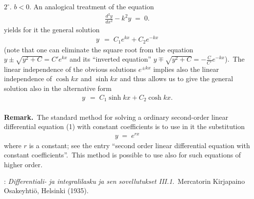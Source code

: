 \documentclass[12pt]{article}
\begin{document}
\textbf{$2^\circ$}.\; $b < 0$.\;  An analogical treatment of 
the equation
\begin{align}
      \frac{d^2y}{dx^2}-k^2y \;=\; 0.
\end{align}
yields for it the general solution
\begin{align}
y \,\;=\; C_1e^{kx}+C_2e^{-kx}
\end{align}
(note that one can eliminate the square root from the equation
$y\pm\sqrt{y^2+C} = C'e^{kx}$ and its ``inverted equation'' 
$y\mp\sqrt{y^2+C} = -\frac{C}{C'}e^{-kx}$).\, The linear independence 
of the obvious solutions $e^{\pm kx}$ implies also the linear 
independence of $\cosh kx$ and $\sinh kx$ and thus allows us to
give the general solution also in the alternative form
\begin{align}
y \,\;=\; C_1\sinh kx+C_2\cosh kx.
\end{align}\\

\textbf{Remark.}\, The standard method for solving a 
ordinary second-order linear differential equation (1) with 
constant coefficients is to use in it the 
substitution
\begin{align}
y \;=\; e^{rx}
\end{align}
where $r$ is a constant; see the entry ``second order linear 
differential equation with constant coefficients''.\, This method 
is possible to use also for such equations of higher order.\\



\begin{thebibliography}{8}
: {\em Differentiali- ja integralilasku
ja sen sovellutukset III.1}.\, Mercatorin Kirjapaino Osakeyhti\"o, Helsinki (1935).
\end{thebibliography}\\
\end{document}
